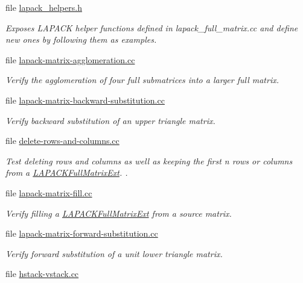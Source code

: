 \begin{DoxyCompactItemize}
\item 
file \hyperlink{lapack__helpers_8h}{lapack\+\_\+helpers.\+h}
\begin{DoxyCompactList}\small\item\em Exposes L\+A\+P\+A\+CK helper functions defined in lapack\+\_\+full\+\_\+matrix.\+cc and define new ones by following them as examples. \end{DoxyCompactList}\item 
file \hyperlink{lapack-matrix-agglomeration_8cc}{lapack-\/matrix-\/agglomeration.\+cc}
\begin{DoxyCompactList}\small\item\em Verify the agglomeration of four full submatrices into a larger full matrix. \end{DoxyCompactList}\item 
file \hyperlink{lapack-matrix-backward-substitution_8cc}{lapack-\/matrix-\/backward-\/substitution.\+cc}
\begin{DoxyCompactList}\small\item\em Verify backward substitution of an upper triangle matrix. \end{DoxyCompactList}\item 
file \hyperlink{delete-rows-and-columns_8cc}{delete-\/rows-\/and-\/columns.\+cc}
\begin{DoxyCompactList}\small\item\em Test deleting rows and columns as well as keeping the first {\ttfamily n} rows or columns from a \hyperlink{classLAPACKFullMatrixExt}{L\+A\+P\+A\+C\+K\+Full\+Matrix\+Ext}. . \end{DoxyCompactList}\item 
file \hyperlink{lapack-matrix-fill_8cc}{lapack-\/matrix-\/fill.\+cc}
\begin{DoxyCompactList}\small\item\em Verify filling a \hyperlink{classLAPACKFullMatrixExt}{L\+A\+P\+A\+C\+K\+Full\+Matrix\+Ext} from a source matrix. \end{DoxyCompactList}\item 
file \hyperlink{lapack-matrix-forward-substitution_8cc}{lapack-\/matrix-\/forward-\/substitution.\+cc}
\begin{DoxyCompactList}\small\item\em Verify forward substitution of a unit lower triangle matrix. \end{DoxyCompactList}\item 
file \hyperlink{hstack-vstack_8cc}{hstack-\/vstack.\+cc}

\end{DoxyCompactItemize}
